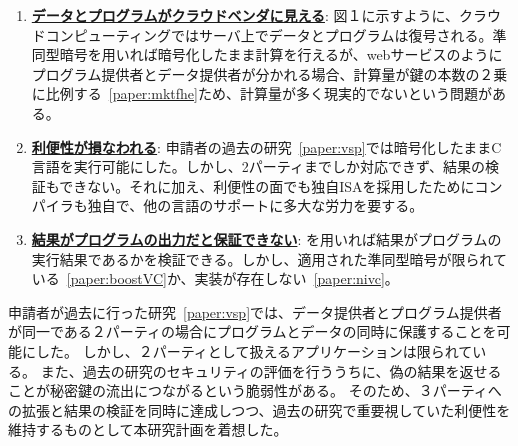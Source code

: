 \begin{enumerate}[label=(\roman*),leftmargin=0.5cm]
\setlength{\parskip}{0cm} %
\setlength{\itemsep}{0cm} %
    \item \underline{\textbf{データとプログラムがクラウドベンダに見える}}: 図１に示すように、クラウドコンピューティングではサーバ上でデータとプログラムは復号される。準同型暗号を用いれば暗号化したまま計算を行えるが、webサービスのようにプログラム提供者とデータ提供者が分かれる場合、計算量が鍵の本数の２乗に比例する~\ref{paper:mktfhe}ため、計算量が多く現実的でないという問題がある。\label{prob:maliciousvender}
    \item  \underline{\textbf{利便性が損なわれる}}: 申請者の過去の研究~\ref{paper:vsp}では暗号化したままC言語を実行可能にした。しかし、2パーティまでしか対応できず、結果の検証もできない。それに加え、利便性の面でも独自ISAを採用したためにコンパイラも独自で、他の言語のサポートに多大な労力を要する。\label{prob:usability}
    \item  \underline{\textbf{結果がプログラムの出力だと保証できない}}: を用いれば結果がプログラムの実行結果であるかを検証できる。しかし、適用された準同型暗号が限られている~\ref{paper:boostVC}か、実装が存在しない~\ref{paper:nivc}。\label{prob:verifiability}
\end{enumerate}


申請者が過去に行った研究~\ref{paper:vsp}では、データ提供者とプログラム提供者が同一である２パーティの場合にプログラムとデータの同時に保護することを可能にした。
しかし、２パーティとして扱えるアプリケーションは限られている。
また、過去の研究のセキュリティの評価を行ううちに、偽の結果を返せることが秘密鍵の流出につながるという脆弱性がある。
そのため、３パーティへの拡張と結果の検証を同時に達成しつつ、過去の研究で重要視していた利便性を維持するものとして本研究計画を着想した。




